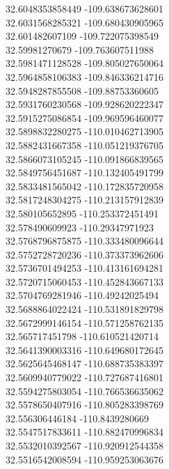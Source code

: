 {32.6048353858449	-109.638673628601\\
32.6031568285321	-109.680430905965\\
32.601482607109	-109.722075398549\\
32.59981270679	-109.763607511988\\
32.5981471128528	-109.805027650064\\
32.5964858106383	-109.846336214716\\
32.5948287855508	-109.88753360605\\
32.5931760230568	-109.928620222347\\
32.5915275086854	-109.969596460077\\
32.5898832280275	-110.010462713905\\
32.5882431667358	-110.051219376705\\
32.5866073105245	-110.091866839565\\
32.5849756451687	-110.132405491799\\
32.5833481565042	-110.172835720958\\
32.5817248304275	-110.213157912839\\
32.580105652895	-110.253372451491\\
32.578490609923	-110.29347971923\\
32.5768796875875	-110.333480096644\\
32.5752728720236	-110.373373962606\\
32.5736701494253	-110.413161694281\\
32.5720715060453	-110.452843667133\\
32.5704769281946	-110.49242025494\\
32.5688864022424	-110.531891829798\\
32.5672999146154	-110.571258762135\\
32.565717451798	-110.610521420714\\
32.5641390003316	-110.649680172645\\
32.5625645468147	-110.688735383397\\
32.5609940779022	-110.727687416801\\
32.5594275803054	-110.766536635062\\
32.5578650407916	-110.805283398769\\
32.556306446184	-110.8439280669\\
32.5547517833611	-110.882470996834\\
32.5532010392567	-110.920912544358\\
32.5516542008594	-110.959253063676\\
}
